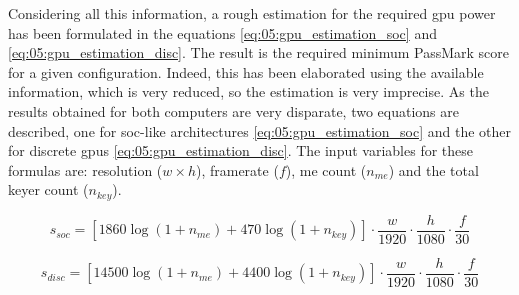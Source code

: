 \documentclass[../main.tex]{subfiles}
\begin{document}
Considering all this information, a rough estimation for the required \gls{gpu} power has been formulated in the equations \eqref{eq:05:gpu_estimation_soc} and \eqref{eq:05:gpu_estimation_disc}. The result is the required minimum PassMark score for a given configuration. Indeed, this has been elaborated using the available information, which is very reduced, so the estimation is very imprecise. As the results obtained for both computers are very disparate, two equations are described, one for \gls{soc}-like architectures \eqref{eq:05:gpu_estimation_soc} and the other for discrete \glspl{gpu} \eqref{eq:05:gpu_estimation_disc}. The input variables for these formulas are: resolution ($w \times h$), framerate ($f$), \gls{me} count ($n_{me}$) and the total keyer count ($n_{key}$).\newline

\begin{equation}\label{eq:05:gpu_estimation_soc}
    s_{soc} = [1860\log(1 + n_{me}) + 470\log(1 + n_{key})]\cdot\frac{w}{1920}\cdot\frac{h}{1080}\cdot\frac{f}{30}
\end{equation}

\begin{equation}\label{eq:05:gpu_estimation_disc}
    s_{disc} = [14500\log(1 + n_{me}) + 4400\log(1 + n_{key})]\cdot\frac{w}{1920}\cdot\frac{h}{1080}\cdot\frac{f}{30}
\end{equation}

\end{document}
